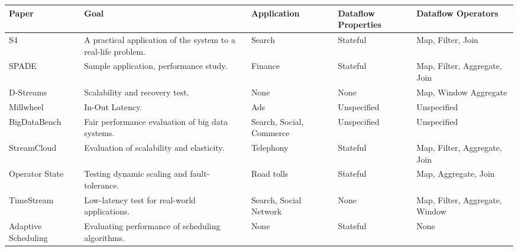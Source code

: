 \begin{table}[H]
  \centering
  {
    \scriptsize
    \hspace*{-1cm}
    \begin{tabular}{|p{3cm}|p{4cm}|p{3cm}|p{2.5cm}|p{2.5cm}|}
      \hline
      Paper & Goal & Application & Dataflow Properties & Dataflow Operators
      \\\hline
      
      S4\cite{s4}
      & A practical application of the system to a real-life problem.
      & Search
      & Stateful
      & Map, Filter, Join
      \\\hline
      
      SPADE\cite{spade}
      & Sample application, performance study.
      & Finance
      & Stateful
      & Map, Filter, Aggregate, Join
      \\\hline

      D-Streams\cite{discretized}
      & Scalability and recovery test.
      & None
      & None
      & Map, Window Aggregate
      \\\hline

      Millwheel\cite{millwheel}
      & In-Out Latency.
      & Ads
      & Unspecified
      & Unspecified
      \\\hline

      BigDataBench\cite{bigdatabench}
      & Fair performance evaluation of big data systems.
      & Search, Social, Commerce
      & Unspecified
      & Unspecified
      \\\hline

      StreamCloud\cite{streamcloud}
      & Evaluation of scalability and elasticity.
      & Telephony
      & Stateful
      & Map, Filter, Aggregate, Join
      \\\hline

      Operator State\cite{integrating}
      & Testing dynamic scaling and fault-tolerance.
      & Road tolls
      & Stateful
      & Map, Aggregate, Join
      \\\hline

      TimeStream\cite{timestream}
      & Low-latency test for real-world applications.
      & Search, Social Network
      & None
      & Map, Filter, Aggregate, Window
      \\\hline

      Adaptive Scheduling\cite{storm}
      & Evaluating performance of scheduling algorithms.
      & None
      & Stateful
      & None
      \\\hline


\end{tabular}}
\end{table}
